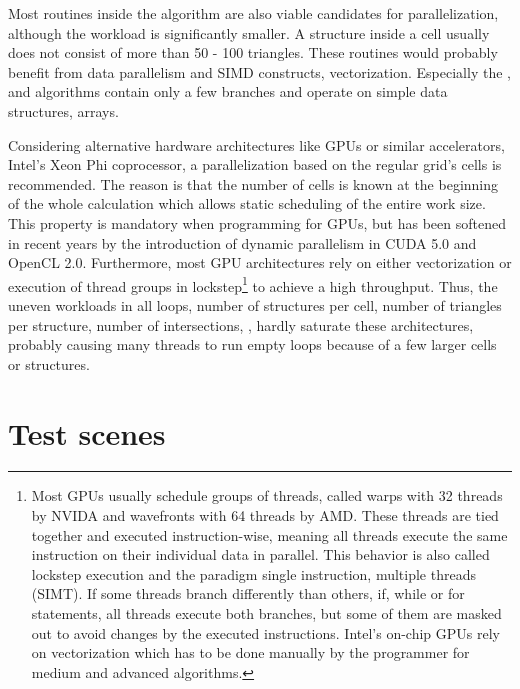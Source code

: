 Most routines inside the  algorithm are also viable candidates for parallelization, although the workload is significantly smaller.
A structure inside a cell usually does not consist of more than 50 - 100 triangles.
These routines would probably benefit from data parallelism and SIMD constructs, \ie vectorization.
Especially the ,  and  algorithms contain only a few branches and operate on simple data structures, \ie arrays.

Considering alternative hardware architectures like GPUs or similar accelerators, \eg Intel's Xeon Phi coprocessor, a parallelization based on the regular grid's cells is recommended.
The reason is that the number of cells is known at the beginning of the whole calculation which allows static scheduling of the entire work size.
This property is mandatory when programming for GPUs, but has been softened in recent years by the introduction of dynamic parallelism in CUDA 5.0 and OpenCL 2.0.
Furthermore, most GPU architectures rely on either vectorization or execution of thread groups in lockstep\footnote{
	Most GPUs usually schedule groups of threads, called warps with 32 threads by NVIDA and wavefronts with 64 threads by AMD.
	These threads are tied together and executed instruction-wise, meaning all threads execute the same instruction on their individual data in parallel.
	This behavior is also called lockstep execution and the paradigm single instruction, multiple threads (SIMT).
	If some threads branch differently than others, \eg if, while or for statements, all threads execute both branches, but some of them are masked out to avoid changes by the executed instructions.
	Intel's on-chip GPUs rely on vectorization which has to be done manually by the programmer for medium and advanced algorithms.} to achieve a high throughput.
Thus, the uneven workloads in all loops, \eg number of structures per cell, number of triangles per structure, number of intersections, \etc, hardly saturate these architectures, probably causing many threads to run empty loops because of a few larger cells or structures.


\section{Test scenes}
\label{sec:test_scenes}

